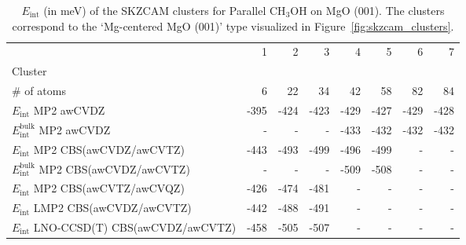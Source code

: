 \begin{table}
\caption{\label{tab:system_eint_mgo_ch3oh_parallel}$E_\textrm{int}$ (in meV) of the SKZCAM clusters for Parallel CH$_3$OH on MgO (001). The clusters correspond to the `Mg-centered MgO (001)' type visualized in Figure~\ref{fig:skzcam_clusters}.}
\begin{adjustbox}{center,max width=1.4\textwidth}
\begin{tabular}{lrrrrrrr}
\toprule
 & 1 & 2 & 3 & 4 & 5 & 6 & 7 \\ 
Cluster &  &  &  &  &  &  &  \\
\midrule
\# of atoms & 6 & 22 & 34 & 42 & 58 & 82 & 84 \\
$E_\textrm{int}$ MP2 awCVDZ & -395 & -424 & -423 & -429 & -427 & -429 & -428 \\
$E_\textrm{int}^\textrm{bulk}$ MP2 awCVDZ & - & - & - & -433 & -432 & -432 & -432 \\
$E_\textrm{int}$ MP2 CBS(awCVDZ/awCVTZ) & -443 & -493 & -499 & -496 & -499 & - & - \\
$E_\textrm{int}^\textrm{bulk}$ MP2 CBS(awCVDZ/awCVTZ) & - & - & - & -509 & -508 & - & - \\
$E_\textrm{int}$ MP2 CBS(awCVTZ/awCVQZ) & -426 & -474 & -481 & - & - & - & - \\
$E_\textrm{int}$ LMP2 CBS(awCVDZ/awCVTZ) & -442 & -488 & -491 & - & - & - & - \\
$E_\textrm{int}$ LNO-CCSD(T) CBS(awCVDZ/awCVTZ) & -458 & -505 & -507 & - & - & - & - \\
\bottomrule
\end{tabular}
\end{adjustbox}
\end{table}

